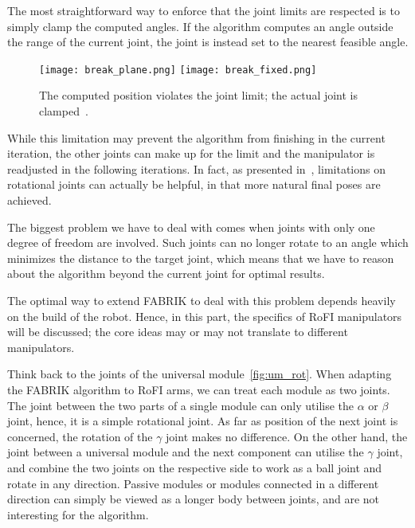 The most straightforward way to enforce that the joint limits are respected is to simply clamp the computed angles. If the algorithm computes an angle outside the range of the current joint,
the joint is instead set to the nearest feasible angle.

\begin{figure}[h]
    \centering
    \begin{minipage}{\textwidth}
        \texttt{[image: break\_plane.png]}
        \texttt{[image: break\_fixed.png]}
    \end{minipage}
    \caption{The computed position violates the joint limit; the actual joint is clamped~\cite{Ondika2021thesis}.}\label{fig:break}
\end{figure}

While this limitation may prevent the algorithm from finishing in the current iteration, the other joints can make up for the limit and the manipulator is readjusted in the following iterations. In fact, as presented in~\cite{fabrik}, limitations on rotational joints can actually be helpful, in that more natural final poses are achieved.

The biggest problem we have to deal with comes when joints with only one degree of freedom are involved. Such joints can no longer rotate to an angle which minimizes the distance to the target joint, which means that we have to reason about the algorithm beyond the current joint for optimal results.

The optimal way to extend FABRIK to deal with this problem depends heavily on the build of the robot. Hence, in this part, the specifics of RoFI manipulators will be discussed; the core ideas may or may not translate to different manipulators.

Think back to the joints of the universal module~\ref{fig:um_rot}. When adapting the FABRIK algorithm to RoFI arms, we can treat each module as two joints. The joint between the two parts of a single module can only utilise the $\alpha$ or $\beta$ joint, hence, it is a simple rotational joint. As far as position of the next joint is concerned, the rotation of the $\gamma$ joint makes no difference. On the other hand, the joint between a universal module and the next component can utilise the $\gamma$ joint, and combine the two joints on the respective side to work as a ball joint and rotate in any direction. Passive modules or modules connected in a different direction can simply be viewed as a longer body between joints, and are not interesting for the algorithm.

